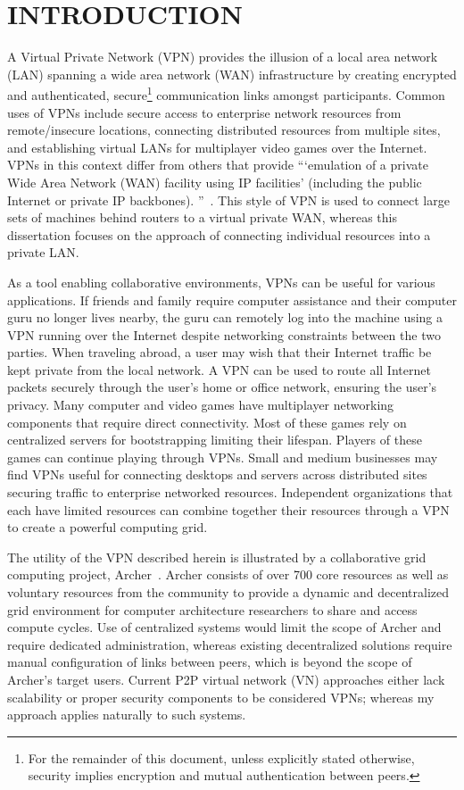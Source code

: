 \chapter{INTRODUCTION}
\label{introduction}

A Virtual Private Network (VPN) provides the illusion of a local area network
(LAN) spanning a wide area network (WAN) infrastructure by creating encrypted
and authenticated, secure\footnote{For the remainder of this document, unless
explicitly stated otherwise, security implies encryption and mutual
authentication between peers.} communication links amongst participants.
Common uses of VPNs include secure access to enterprise network resources from
remote/insecure locations, connecting distributed resources from multiple
sites, and establishing virtual LANs for multiplayer video games over the
Internet.  VPNs in this context differ from others that provide ```emulation of
a private Wide Area Network (WAN) facility using IP facilities' (including the
public Internet or private IP backbones).  ''~\cite{ip_vpns}.  This style of
VPN is used to connect large sets of machines behind routers to a virtual
private WAN, whereas this dissertation focuses on the approach of connecting
individual resources into a private LAN.

As a tool enabling collaborative environments, VPNs can be useful for various
applications.  If friends and family require computer assistance and their
computer guru no longer lives nearby, the guru can remotely log into the
machine using a VPN running over the Internet despite networking constraints
between the two parties.  When traveling abroad, a user may wish that their
Internet traffic be kept private from the local network.  A VPN can be used to
route all Internet packets securely through the user's home or office network,
ensuring the user's privacy.  Many computer and video games have multiplayer
networking components that require direct connectivity.  Most of these games
rely on centralized servers for bootstrapping limiting their lifespan.  Players
of these games can continue playing through VPNs.  Small and medium businesses
may find VPNs useful for connecting desktops and servers across distributed
sites securing traffic to enterprise networked resources.  Independent
organizations that each have limited resources can combine together their
resources through a VPN to create a powerful computing grid.

The utility of the VPN described herein is illustrated by a collaborative grid
computing project, Archer~\cite{archer}.  Archer consists of over 700 core
resources as well as voluntary resources from the community to provide a
dynamic and decentralized grid environment for computer architecture
researchers to share and access compute cycles.  Use of centralized systems
would limit the scope of Archer and require dedicated administration, whereas
existing decentralized solutions require manual configuration of links between
peers, which is beyond the scope of Archer's target users.  Current P2P virtual
network (VN) approaches either lack scalability or proper security components
to be considered VPNs; whereas my approach applies naturally to such systems.

